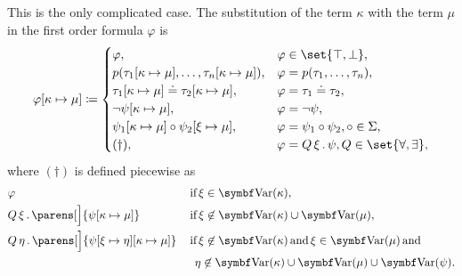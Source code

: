 \begin{definition}
\begin{defenum}
     This is the only complicated case. The substitution of the term \( \kappa \) with the term \( \mu \) in the first order formula \( \varphi \) is
    \begin{equation}\label{eq:def:first_order_substitution/term_in_formula}
      \varphi[\kappa \mapsto \mu] \coloneqq \begin{cases}
        \varphi,                                                           &\varphi \in \set{ \top, \bot }, \\
        p(\tau_1[\kappa \mapsto \mu], \ldots, \tau_n[\kappa \mapsto \mu]), &\varphi = p(\tau_1, \ldots, \tau_n), \\
        \tau_1[\kappa \mapsto \mu] \doteq \tau_2[\kappa \mapsto \mu],      &\varphi = \tau_1 \doteq \tau_2, \\
        \neg \psi[\kappa \mapsto \mu],                                     &\varphi = \neg \psi, \\
        \psi_1[\kappa \mapsto \mu] \circ \psi_2[\xi \mapsto \mu],          &\varphi = \psi_1 \circ \psi_2, \circ \in \Sigma, \\
        (\dagger),                                                         &\varphi = \quantifier{Q}{\xi} \psi, Q \in \set{ \forall, \exists },
      \end{cases}
    \end{equation}
    where \( (\dagger) \) is defined piecewise as
    \begin{align}
      &\varphi                                                                    &&\T{if} \xi \in \bfop{Var}(\kappa), \label{eq:def:first_order_substitution/term_in_formula/quantifiers/trivial} \\
      &\quantifier{Q}{\xi} \parens[\Big]{\psi[\kappa \mapsto \mu]}                    &&\T{if} \xi \not\in \bfop{Var}(\kappa) \cup \bfop{Var}(\mu), \label{eq:def:first_order_substitution/term_in_formula/quantifiers/direct} \\
      &\quantifier{Q}{\eta} \parens[\Big]{\psi[\xi \mapsto \eta][\kappa \mapsto \mu]} &&\T{if} \xi \not\in \bfop{Var}(\kappa) \T{and} \xi \in \bfop{Var}(\mu) \T{and} \label{eq:def:first_order_substitution/term_in_formula/quantifiers/renaming} \\
                                                                                  &&&\phantom{\T{if}} \eta \not\in \bfop{Var}(\kappa) \cup \bfop{Var}(\mu) \cup \bfop{Var}(\psi). \nonumber
    \end{align}


\end{defenum}
\end{definition}
